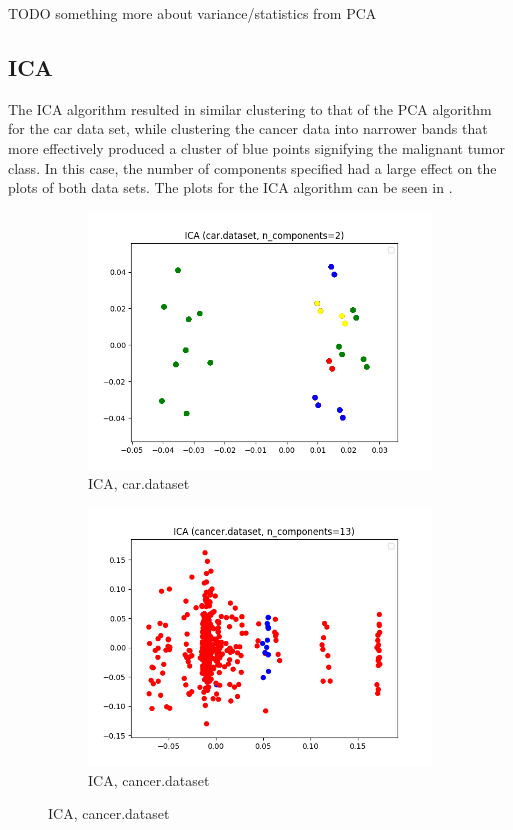 \documentclass{article}
\begin{document}
      TODO something more about variance/statistics from PCA

    \subsection{ICA}
      The ICA algorithm resulted in similar clustering to that of the PCA algorithm for the car data set, while clustering the cancer data into narrower bands that more effectively produced a cluster of blue points signifying the malignant tumor class. In this case, the number of components specified had a large effect on the plots of both data sets. The plots for the ICA algorithm can be seen in .

      \begin{figure}[htb]
      \centering

        \begin{subfigure}{0.4\textwidth}
          \includegraphics[width=\linewidth]{out/ica/car-ica-comp-2.png}
          \caption{ICA, car.dataset}
          \label{fig:ica-plot-car}
        \end{subfigure}\hfil
        \begin{subfigure}{0.4\textwidth}
          \includegraphics[width=\linewidth]{out/ica/cancer-ica-comp-13.png}
          \caption{ICA, cancer.dataset}
          \label{fig:ica-plot-cancer}
        \end{subfigure}


\end{figure}
\end{document}
